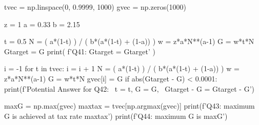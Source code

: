 \documentclass[14pt]{extarticle}
\begin{document}
\begin{Exercise}
\begin{pythoncode}
tvec = np.linspace(0, 0.9999, 1000)
gvec = np.zeros(1000)

z = 1
a = 0.33
b = 2.15

t = 0.5
N = ( a*(1-t) ) / ( b*(a*(1-t) + (1-a)) )
w = z*a*N**(a-1)
G = w*t*N
Gtarget = G
print( f'Q41: Gtarget = {Gtarget}' )

i = -1
for t in tvec:
    i = i + 1
    N = ( a*(1-t) ) / ( b*(a*(1-t) + (1-a)) )
    w = z*a*N**(a-1)
    G = w*t*N
    gvec[i] = G
    if abs(Gtarget - G) < 0.0001:
        print(f'Potential Answer for Q42: \
                t = {t}, G = {G}, \
                Gtarget - G = {Gtarget - G}')


maxG = np.max(gvec)
maxtax = tvec[np.argmax(gvec)]
print(f'Q43: maximum G is achieved at tax rate {maxtax}')
print(f'Q44: maximum G is {maxG}')
\end{pythoncode}



\end{Exercise}
\end{document}
